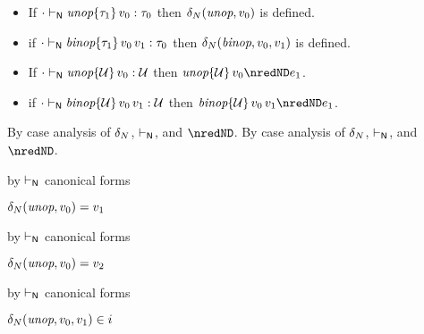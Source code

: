 \begin{lemma}\label{H-delta-type-progress}\leavevmode
  \begin{itemize}
    \item
      If\/ ${\cdot} \vdash_{\mathsf{N}} \textit{unop}{\{\tau_1\}}\,v_0 : \tau_0$
      then\/ $\delta_{N}(\textit{unop}, v_0)$ is defined.
    \item
      if\/ ${\cdot} \vdash_{\mathsf{N}} \textit{binop}{\{\tau_1\}}\,v_0\,v_1 : \tau_0$
      then\/ $\delta_{N}(\textit{binop}, v_0, v_1)$ is defined.
    \item
      If\/ ${\cdot} \vdash_{\mathsf{N}} \textit{unop}{\{{\mathcal U}\}}\,v_0 : {\mathcal U}$
      then\/ $\eunopt{\tdyn}{\svalue_0} \nredND \sexpr_1$.
    \item
      if\/ ${\cdot} \vdash_{\mathsf{N}} \textit{binop}{\{{\mathcal U}\}}\,v_0\,v_1 : {\mathcal U}$
      then\/ $\ebinopt{\tdyn}{\svalue_0}{\svalue_1} \nredND \sexpr_1$.
  \end{itemize}
\end{lemma}{
  \newcommand{\shortpf}{By case analysis of $\sdeltaH$, $\sWTN$, and $\nredND$.}
\begin{lamportproof*}
  \shortpf
\mainproof
  \shortpf

    \begin{pfproof}
        \begin{pfproof}
          by $\vdash_{\mathsf{N}}$ canonical forms
        \end{pfproof}
      \qedstep
        \begin{pfproof}
          $\delta_{N}(\textit{unop}, v_0) = v_1$
        \end{pfproof}
    \end{pfproof}

    \begin{pfproof}
        \begin{pfproof}
          by $\vdash_{\mathsf{N}}$ canonical forms
        \end{pfproof}
      \qedstep
        \begin{pfproof}
          $\delta_{N}(\textit{unop}, v_0) = v_2$
        \end{pfproof}
    \end{pfproof}

    \begin{pfproof}
        \begin{pfproof}
          by $\vdash_{\mathsf{N}}$ canonical forms
        \end{pfproof}
      \qedstep
        \begin{pfproof}
          $\delta_{N}(\textit{unop}, v_0, v_1) \in i$
        \end{pfproof}
    \end{pfproof}


\end{lamportproof*}}
